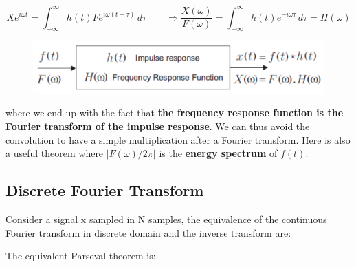 			\begin{equation}
			Xe^{i\omega t} = \int _{-\infty}^\infty h(t)Fe^{i\omega (t-\tau)} \, d\tau \qquad \Rightarrow \frac{X(\omega)}{F(\omega)} = \int _{-\infty}^\infty h(t)e^{-i\omega \tau} \, d\tau = H(\omega)
			\end{equation}
			
			\begin{figure}
			\vspace{-5mm}
			\includegraphics[scale=0.3]{vibration/ch1/11}
			\end{figure}
			where we end up with the fact that \textbf{the frequency response function is the Fourier transform of the impulse response}. We can thus avoid the convolution to have a simple multiplication after a Fourier transform. Here is also a useful theorem where $|F(\omega)/2\pi |$ is the \textbf{energy spectrum} of $f(t)$: 
			
			\begin{center}
			\end{center}
			
		\subsection{Discrete Fourier Transform}
			Consider a signal x sampled in N samples, the equivalence of the continuous Fourier transform in discrete domain and the inverse transform are:
			
			\begin{center}
			\end{center}
			
			The equivalent Parseval theorem is:
			
